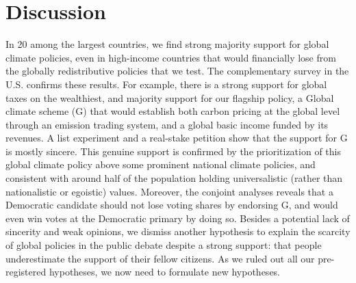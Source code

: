 \documentclass{nature}
\begin{document}
\section{Discussion} %
In 20 among the largest countries, we find strong majority support for global climate policies, even in high-income countries that would financially lose from the globally redistributive policies that we test. The complementary survey in the U.S. confirms these results. For example, there is a strong support for global taxes on the wealthiest, and majority support for our flagship policy, a Global climate scheme (G) that would establish both carbon pricing at the global level through an emission trading system, and a global basic income funded by its revenues. A list experiment and a real-stake petition show that the support for G is mostly sincere. This genuine support is confirmed by the prioritization of this global climate policy above some prominent national climate policies, and consistent with around half of the population holding universalistic (rather than nationalistic or egoistic) values. Moreover, the conjoint analyses reveals that a Democratic candidate should not lose voting shares by endorsing G, and would even win votes at the Democratic primary by doing so. Besides a potential lack of sincerity and weak opinions, we dismiss another hypothesis to explain the scarcity of global policies in the public debate despite a strong support: that people underestimate the support of their fellow citizens. As we ruled out all our pre-registered hypotheses, we now need to formulate new hypotheses.
\end{document}

